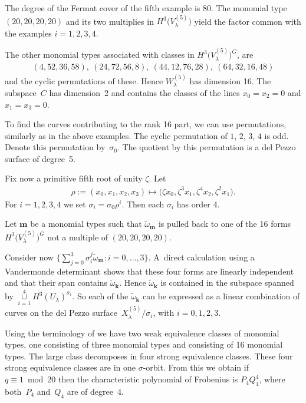 \documentclass[pdftex]{sigma}
\numberwithin{equation}{section}
\begin{document}
\begin{Example} The degree of the Fermat cover of the f\/ifth example is 80. The monomial type $(20,20,20,20)$ and its two multiplies in $H^3\big(V_{\lambda}^{(5)}\big)$ yield the factor common with the examples $i=1,2,3,4$.

The other monomial types associated with classes in $H^3\big(V_{\lambda}^{(5)}\big)^G$, are \begin{gather*}(4,52,36,58),\ (24,72,56,8),\ (44,12,76,28),\ (64,32,16,48)\end{gather*} and the cyclic permutations of these.
Hence $W_\lambda^{(5)}$ has dimension 16. The subspace~$C$ has dimension~2 and contains the classes of the lines $x_0=x_2=0$ and $x_1=x_3=0$.

To f\/ind the curves contributing to the rank 16 part, we can use permutations, similarly as in the above examples. The cyclic permutation of $1$, $2$, $3$, $4$ is odd. Denote this permutation by~$\sigma_0$. The quotient by this permutation is a del Pezzo surface of degree~5.

Fix now a primitive f\/ifth root of unity $\zeta$. Let
\begin{gather*} \rho:=(x_0,x_1,x_2,x_3)\mapsto \big(\zeta x_0, \zeta^3 x_1,\zeta^4 x_2,\zeta^2 x_1\big).\end{gather*} For $i=1,2,3,4$ we set $\sigma_i=\sigma_0\rho^i$. Then each $\sigma_i$ has order 4.

Let $\mathbf{m}$ be a monomial types such that $\tilde{\omega}_{\mathbf{m}}$ is pulled back to one of the 16 forms $H^3\big(V_{\lambda}^{(5)}\big)^G$ not a multiple of $(20,20,20,20)$.

Consider now $\big\{ \sum\limits_{j=0}^3 \sigma_i^j \tilde{\omega}_{\mathbf{m}} \colon i=0,\dots,3\big\}$. A~direct calculation using a Vandermonde determinant shows that these four forms are linearly independent and that their span contains $\tilde{\omega}_{\mathbf{k}}$. Hence $\tilde{\omega}_{\mathbf{k}}$ is contained in the subspace spanned by $\mathop{\cup}\limits_{i=1}^4 H^3(U_\lambda)^{\sigma_i}$. So each of the $\tilde{\omega}_{\mathbf{k}}$ can be expressed as a linear combination of curves on the del Pezzo surface~$X_{\lambda}^{(5)}/\sigma_i$, with $i=0,1,2,3$.

Using the terminology of \cite[Section~6]{zetafam} we have two weak equivalence classes of monomial types, one consisting of three monomial types and consisting of 16 monomial types. The large class decomposes in four strong equivalence classes. These four strong equivalence classes are in one $\sigma$-orbit. From this we obtain if $q\equiv 1 \bmod 20$ then the characteristic polynomial of Frobenius is $P_4 Q_4^4$, where both~$P_4$ and~$Q_4$ are of degree~4.


\end{Example}
\end{document}
